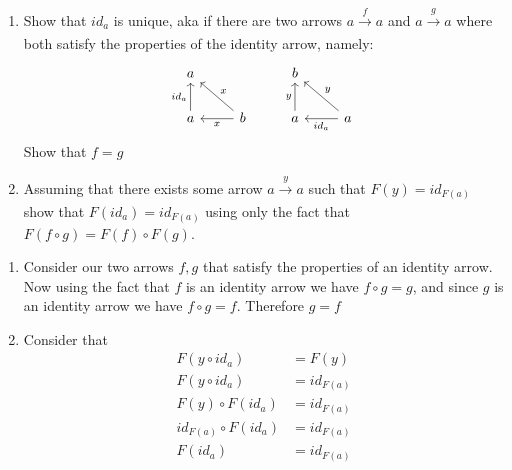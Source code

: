 \begin{Exercise}
    \begin{enumerate}[label=(\alph*)]
        \item Show that $id_a$ is unique, aka if there are two arrows $a \xrightarrow[]{f} a$ and $a \xrightarrow[]{g} a$ where both satisfy the properties of the identity arrow, namely:
        \[\begin{tikzcd}
        	a && b \\
        	a & b & a & a
        	\arrow["x", from=2-2, to=2-1]
        	\arrow["{id_a}", from=2-1, to=1-1]
        	\arrow["x"', from=2-2, to=1-1]
        	\arrow["{id_a}", from=2-4, to=2-3]
        	\arrow["y"', from=2-4, to=1-3]
        	\arrow["y", from=2-3, to=1-3]
        \end{tikzcd}\]
        Show that $f=g$
        \item Assuming that there exists some arrow $a \xrightarrow[]{y} a$ such that $F(y)=id_{F(a)}$ show that $F(id_a)=id_{F(a)}$ using only the fact that $F(f \circ g)= F(f) \circ F(g)$.
        
    \end{enumerate}

\end{Exercise}


\begin{Answer}
    \begin{enumerate}[label=(\alph*)]
        \item Consider our two arrows $f,g$ that satisfy the properties of an identity arrow. Now using the fact that $f$ is an identity arrow we have $f \circ g=g$, and since $g$ is an identity arrow we have $f \circ g =f$. Therefore $g=f$
        \item Consider that 
        \begin{align*}
            F(y \circ id_a) &= F(y)\\
            F(y \circ id_a) &= id_{F(a)}\\
            F(y) \circ F(id_a) &= id_{F(a)}\\
            id_{F(a)} \circ F(id_a) &= id_{F(a)}\\
            F(id_a) &= id_{F(a)}
        \end{align*}
    \end{enumerate}
\end{Answer}



